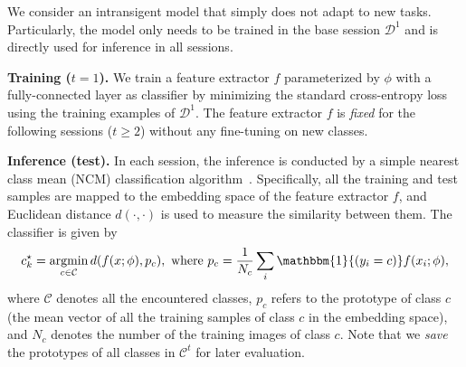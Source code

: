 \documentclass{article}
\DeclareMathOperator*{\argmin}{argmin}
\begin{document}
We consider an intransigent model that simply does not adapt to new tasks. Particularly, the model only needs to be trained in the base session $\mathcal{D}^1$ and is directly used for inference in all sessions. 

\textbf{Training ($t=1$).} We train a feature extractor $f$ parameterized by $\phi$ with a fully-connected layer as classifier by minimizing the standard cross-entropy loss using the training examples of $\mathcal{D}^1$. The feature extractor $f$ is \textit{fixed} for the following sessions ($t\geq 2$) without any fine-tuning on new classes. 

\textbf{Inference (test).}
In each session, the inference is conducted by a simple nearest class mean (NCM) classification algorithm~\citep{mensink2013distance}. Specifically, all the training and test samples are mapped to the embedding space of the feature extractor $f$, and Euclidean distance $d(\cdot,\cdot)$ is used to measure the similarity between them. The classifier is given by
\begin{align}
    c_k^\star = \argmin_{c\in\mathcal{C}} d(f(x;\phi), p_c),\ \text{where} \
    p_c = \frac{1}{N_c} \sum_{i}\mathbbm{1}{(y_i=c)}f(x_i;\phi)\label{eq:prototypes},
\end{align}
where $\mathcal{C}$ denotes all the encountered classes, $p_c$ refers to the prototype of class $c$ (the mean vector of all the training samples of class $c$ in the embedding space), and $N_c$ denotes the number of the training images of class $c$. Note that we \textit{save} the prototypes of all classes in $\mathcal{C}^{t}$ for later evaluation. 
\end{document}
